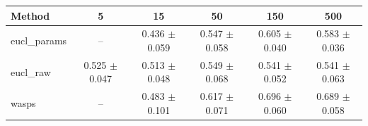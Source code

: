 \begin{table}[htbp]
\centering
\begin{NiceTabular}{lccccc}
\toprule
Method & 5 & 15 & 50 & 150 & 500 \\
\midrule
eucl\_params & -- & 0.436 $\pm$ 0.059 & 0.547 $\pm$ 0.058 & 0.605 $\pm$ 0.040 & 0.583 $\pm$ 0.036 \\
eucl\_raw & 0.525 $\pm$ 0.047 & 0.513 $\pm$ 0.048 & 0.549 $\pm$ 0.068 & 0.541 $\pm$ 0.052 & 0.541 $\pm$ 0.063 \\
wasps & -- & 0.483 $\pm$ 0.101 & 0.617 $\pm$ 0.071 & 0.696 $\pm$ 0.060 & 0.689 $\pm$ 0.058 \\
\bottomrule
\end{NiceTabular}
\label{tab:sens_river_n_samples_knn}
\end{table}
